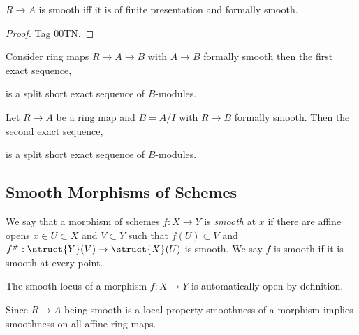 \documentclass[12pt]{article}
\begin{document}
\begin{prop}
$R \to A$ is smooth iff it is of finite presentation and formally smooth.
\end{prop}

\begin{proof}
Tag 00TN.
\end{proof}

\begin{prop}
Consider ring maps $R \to A \to B$ with $A \to B$ formally smooth then the first exact sequence,
\begin{center}
\end{center}
is a split short exact sequence of $B$-modules.
\end{prop}

\begin{prop}
Let $R \to A$ be a ring map and $B = A/I$ with $R \to B$ formally smooth. Then the second exact sequence,
\begin{center}
\end{center}
is a split short exact sequence of $B$-modules.
\end{prop}

\subsection{Smooth Morphisms of Schemes}

\begin{defn}
We say that a morphism of schemes $f : X \to Y$ is \textit{smooth} at $x$ if there are affine opens $x \in U \subset X$ and $V \subset Y$ such that $f(U) \subset V$ and $f^\# : \struct{Y}(V) \to \struct{X}(U)$ is smooth. We say $f$ is smooth if it is smooth at every point.
\end{defn}

\begin{rmk}
The smooth locus of a morphism $f : X \to Y$ is automatically open by definition.
\end{rmk}

\begin{rmk}
Since $R \to A$ being smooth is a local property smoothness of a morphism implies smoothness on all affine ring maps.
\end{rmk}
\end{document}
